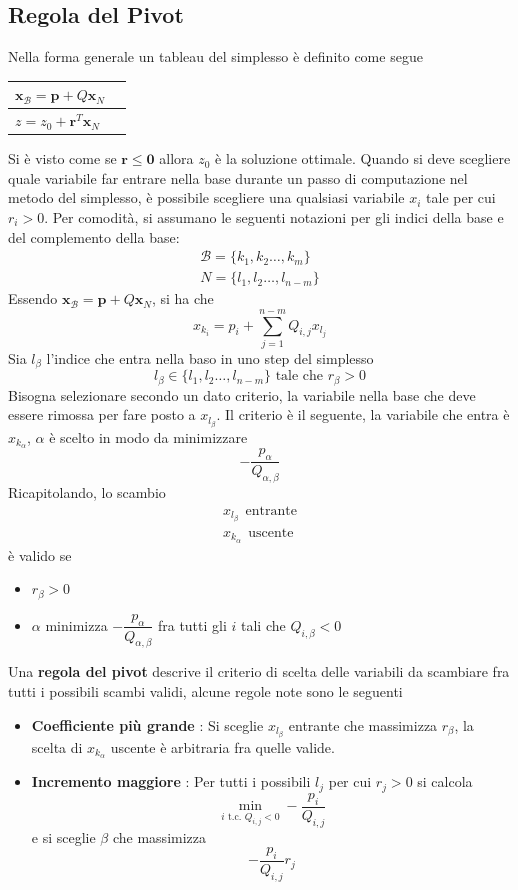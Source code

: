 \documentclass[10pt, letterpaper]{report}
\begin{document}
\subsection{Regola del Pivot}
Nella forma generale un tableau del simplesso è definito come segue 
\begin{center}
    \begin{tabular}{|l|l|}\hline 
       $\mathbf{x}_\mathcal{B} = \mathbf p + Q\mathbf x_N$\\ \hline 
       $z=z_0+\mathbf r^T\mathbf x_N$ \\\hline 
    \end{tabular}
\end{center}
Si è visto come se $\mathbf r \le \mathbf 0$ allora $z_0$ è la soluzione ottimale. Quando si deve scegliere quale variabile far entrare nella base durante un passo di computazione nel metodo del simplesso, è possibile scegliere una qualsiasi variabile $x_i$ tale per cui $r_i>0$. Per comodità, si assumano le seguenti notazioni per gli indici della base e del complemento della base:\begin{eqnarray*}
    \mathcal B = \{k_1,k_2\dots,k_m\}\\ 
    N=\{l_1,l_2\dots, l_{n-m}\}
\end{eqnarray*}
Essendo $\mathbf{x}_\mathcal{B} = \mathbf p + Q\mathbf x_N$, si ha che 
$$ x_{k_i}=p_i+\sum_{j=1}^{n-m}Q_{i,j}x_{l_j}$$
Sia $l_{\beta}$ l'indice che entra nella baso in uno step del simplesso 
$$ l_\beta\in\{l_1,l_2\dots, l_{n-m}\} \text{ tale che }r_{\beta}>0$$
Bisogna selezionare secondo un dato criterio, la variabile nella base che deve essere rimossa per fare posto a $x_{l_\beta}$. Il criterio è il seguente, la variabile che entra è $x_{k_\alpha}$, $\alpha$ è scelto in modo da minimizzare 
$$-\frac{p_\alpha}{Q_{\alpha,\beta}} $$
Ricapitolando, lo scambio 
\begin{eqnarray*}
    x_{l_\beta} \ \  \text{entrante}\\
    x_{k_\alpha} \ \  \text{uscente}
\end{eqnarray*}
è valido se\begin{itemize}
    \item $r_\beta>0$\\ 
    \item $\alpha$ minimizza $-\dfrac{p_\alpha}{Q_{\alpha,\beta}}$ fra tutti gli $i$ tali che $Q_{i,\beta}<0$
\end{itemize}
Una \textbf{regola del pivot} descrive il criterio di scelta delle variabili da scambiare fra tutti i possibili scambi validi, alcune regole note sono le seguenti\begin{itemize}
    \item \textbf{Coefficiente più grande} : Si sceglie $x_{l_\beta}$ entrante che massimizza $r_\beta$, la scelta di $x_{k_\alpha}$ uscente è arbitraria fra quelle valide. 
    \item \textbf{Incremento maggiore} : Per tutti i possibili $l_j$ per cui $r_j>0$ si calcola 
    $$ \min_{i\text{ t.c. }Q_{i,j}<0}-\frac{p_i}{Q_{i,j}}$$
    e si sceglie $\beta$ che massimizza $$-\frac{p_i}{Q_{i,j}} r_j $$
\end{itemize}
\end{document}
